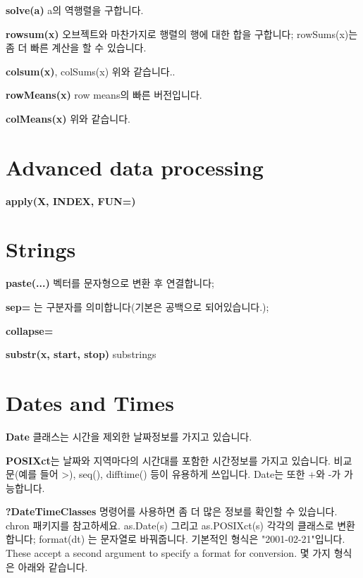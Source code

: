 \documentclass[landscape,twocolumn,letterpaper]{article}
\begin{document}
\textbf{solve(a)} a의 역행렬을 구합니다.

\textbf{rowsum(x)} 오브젝트와 마찬가지로 행렬의 행에 대한 합을 구합니다; rowSums(x)는 좀 더 빠른 계산을 할 수
있습니다.

\textbf{colsum(x)}, colSums(x) 위와 같습니다..

\textbf{rowMeans(x)} row means의 빠른 버전입니다.

\textbf{colMeans(x)} 위와 같습니다.





\section{Advanced data processing}

\textbf{apply(X, INDEX, FUN=)}

\section{Strings}

\textbf{paste(...)} 벡터를 문자형으로 변환 후 연결합니다;

\textbf{sep= }는 구분자를 의미합니다(기본은 공백으로 되어있습니다.);

\textbf{collapse=}

\textbf{substr(x, start, stop)} substrings





\section{Dates and Times}

\textbf{Date} 클래스는 시간을 제외한 날짜정보를 가지고 있습니다.

\textbf{POSIXct}는 날짜와 지역마다의 시간대를 포함한 시간정보를 가지고 있습니다. 비교문(예를 들어 >), seq(),
difftime() 등이 유용하게 쓰입니다.
Date는 또한 +와 -가 가능합니다.

\textbf{?DateTimeClasses} 명령어를 사용하면 좀 더 많은 정보를 확인할 수 있습니다.
chron 패키지를 참고하세요.
as.Date(s) 그리고 as.POSIXct(s)
각각의 클래스로 변환합니다;
format(dt) 는 문자열로 바꿔줍니다.
기본적인 형식은 "2001-02-21"입니다.
These accept a second argument to specify a format for conversion.
몇 가지 형식은 아래와 같습니다.

\end{document}
